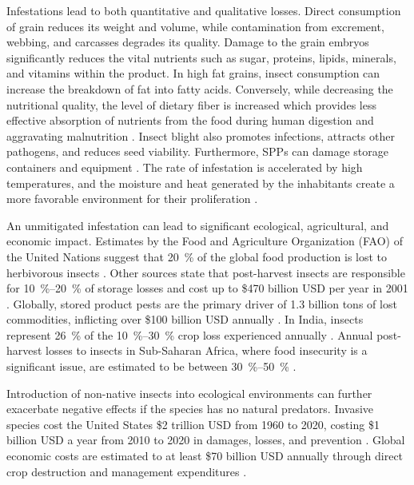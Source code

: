 \documentclass[../Vibro-Acoustic Signatures and Detection Algorithms for Stored Product Insects.tex]{subfiles}
\begin{document}
Infestations lead to both quantitative and qualitative losses. Direct consumption of grain reduces its weight and volume, while contamination from excrement, webbing, and carcasses degrades its quality. Damage to the grain embryos significantly reduces the vital nutrients such as sugar, proteins, lipids, minerals, and vitamins within the product. In high fat grains, insect consumption can increase the breakdown of fat into fatty acids. Conversely, while decreasing the nutritional quality, the level of dietary fiber is increased which provides less effective absorption of nutrients from the food during human digestion and aggravating malnutrition \cite{bamaiyiEffectCallosobruchusMaculatus2006}. Insect blight also promotes infections, attracts other pathogens, and reduces seed viability. Furthermore, SPPs can damage storage containers and equipment \cite{devipriyar.InsectPestDetection2022}. The rate of infestation is accelerated by high temperatures, and the moisture and heat generated by the inhabitants create a more favorable environment for their proliferation \cite{muller-blenkleMethodAcousticStorage2023}.

An unmitigated infestation can lead to significant ecological, agricultural, and economic impact. Estimates by the Food and Agriculture Organization (FAO) of the United Nations suggest that \SI{20}{\percent} of the global food production is lost to herbivorous insects \cite{mohamedn.sallamInsectDamagePostHarvest2013}. Other sources state that post-harvest insects are responsible for \SIrange{10}{20}{\percent} of storage losses \cite{phillipsBiorationalApproachesManaging2010,gogiToxicityRepellencePlant2016} and cost up to \$470 billion USD per year in 2001 \cite{aliSustainableManagementInsect2023}. Globally, stored product pests are the primary driver of 1.3 billion tons of lost commodities, inflicting over \$100 billion USD annually \cite{harmanIncreasingGlobalRisk2025}. In India, insects represent \SI{26}{\percent} of the \SIrange{10}{30}{\percent} crop loss experienced annually \cite{tyagiPostHarvestStoredProduct2019}. Annual post-harvest losses to insects in Sub-Saharan Africa, where food insecurity is a significant issue, are estimated to be between \SIrange{30}{50}{\percent} \cite{mawonekeFarmForkReview2025}.

Introduction of non-native insects into ecological environments can further exacerbate negative effects if the species has no natural predators. Invasive species cost the United States \$2 trillion USD from 1960 to 2020, costing \$1 billion USD a year from 2010 to 2020 in damages, losses, and prevention \cite{fantle-lepczykEconomicCostsBiological2022}. Global economic costs are estimated to at least \$70 billion USD annually through direct crop destruction and management expenditures \cite{bradshawMassiveGrosslyUnderestimated2016}.
\end{document}
